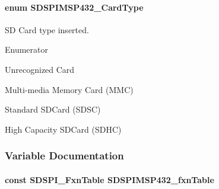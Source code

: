 \paragraph[{S\+D\+S\+P\+I\+M\+S\+P432\+\_\+\+Card\+Type}]{\setlength{\rightskip}{0pt plus 5cm}enum {\bf S\+D\+S\+P\+I\+M\+S\+P432\+\_\+\+Card\+Type}}\label{_s_d_s_p_i_m_s_p432_8h_ac9da30e77207a761e49f62dac9ee8996}


S\+D Card type inserted. 

\begin{Desc}
\item[Enumerator]\par
\begin{description}
\item[{\em 
N\+O\+C\+A\+R\+D\label{_s_d_s_p_i_m_s_p432_8h_ac9da30e77207a761e49f62dac9ee8996a422cdc20ba86c8cdcf1f0fd2318a1cfc}
}]Unrecognized Card \item[{\em 
M\+M\+C\label{_s_d_s_p_i_m_s_p432_8h_ac9da30e77207a761e49f62dac9ee8996aa7d8fca3406f36682514f0384d910fac}
}]Multi-\/media Memory Card (M\+M\+C) \item[{\em 
S\+D\+S\+C\label{_s_d_s_p_i_m_s_p432_8h_ac9da30e77207a761e49f62dac9ee8996a87550a2102744c14e5e2e0ed39cc04b2}
}]Standard S\+D\+Card (S\+D\+S\+C) \item[{\em 
S\+D\+H\+C\label{_s_d_s_p_i_m_s_p432_8h_ac9da30e77207a761e49f62dac9ee8996ab27db2a19a825c3e6f1513cdab7c81ea}
}]High Capacity S\+D\+Card (S\+D\+H\+C) \end{description}
\end{Desc}


\subsubsection{Variable Documentation}
\paragraph[{S\+D\+S\+P\+I\+M\+S\+P432\+\_\+fxn\+Table}]{\setlength{\rightskip}{0pt plus 5cm}const {\bf S\+D\+S\+P\+I\+\_\+\+Fxn\+Table} S\+D\+S\+P\+I\+M\+S\+P432\+\_\+fxn\+Table}\label{_s_d_s_p_i_m_s_p432_8h_a4a2ef2f02901235bce77859ca1d0fe70}
